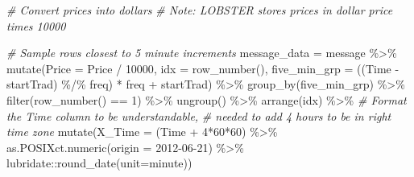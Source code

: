 \documentclass[
  oneside]{book}
\newenvironment{Shaded}{\begin{snugshade}}{\end{snugshade}}
\newcommand{\AttributeTok}[1]{\textcolor[rgb]{0.77,0.63,0.00}{#1}}
\newcommand{\CommentTok}[1]{\textcolor[rgb]{0.56,0.35,0.01}{\textit{#1}}}
\newcommand{\DecValTok}[1]{\textcolor[rgb]{0.00,0.00,0.81}{#1}}
\newcommand{\FunctionTok}[1]{\textcolor[rgb]{0.00,0.00,0.00}{#1}}
\newcommand{\NormalTok}[1]{#1}
\newcommand{\OtherTok}[1]{\textcolor[rgb]{0.56,0.35,0.01}{#1}}
\newcommand{\SpecialCharTok}[1]{\textcolor[rgb]{0.00,0.00,0.00}{#1}}
\newcommand{\StringTok}[1]{\textcolor[rgb]{0.31,0.60,0.02}{#1}}
\begin{document}
\begin{Shaded}
\begin{Highlighting}[]
\CommentTok{\# Convert prices into dollars}
\CommentTok{\#    Note: LOBSTER stores prices in dollar price times 10000}

\CommentTok{\# Sample rows closest to 5 minute increments}
\NormalTok{message\_data }\OtherTok{=}\NormalTok{ message }\SpecialCharTok{\%\textgreater{}\%}
  \FunctionTok{mutate}\NormalTok{(}\AttributeTok{Price =}\NormalTok{ Price }\SpecialCharTok{/} \DecValTok{10000}\NormalTok{,}
         \AttributeTok{idx =} \FunctionTok{row\_number}\NormalTok{(),}
         \AttributeTok{five\_min\_grp =}\NormalTok{ ((Time }\SpecialCharTok{{-}}\NormalTok{ startTrad) }\SpecialCharTok{\%/\%}\NormalTok{ freq) }\SpecialCharTok{*}\NormalTok{ freq }\SpecialCharTok{+}\NormalTok{ startTrad) }\SpecialCharTok{\%\textgreater{}\%} 
  \FunctionTok{group\_by}\NormalTok{(five\_min\_grp) }\SpecialCharTok{\%\textgreater{}\%} 
  \FunctionTok{filter}\NormalTok{(}\FunctionTok{row\_number}\NormalTok{() }\SpecialCharTok{==} \DecValTok{1}\NormalTok{) }\SpecialCharTok{\%\textgreater{}\%} 
  \FunctionTok{ungroup}\NormalTok{() }\SpecialCharTok{\%\textgreater{}\%} 
  \FunctionTok{arrange}\NormalTok{(idx) }\SpecialCharTok{\%\textgreater{}\%}
  \CommentTok{\# Format the Time column to be understandable, }
  \CommentTok{\# needed to add 4 hours to be in right time zone}
  \FunctionTok{mutate}\NormalTok{(}\AttributeTok{X\_Time =}\NormalTok{ (Time }\SpecialCharTok{+} \DecValTok{4}\SpecialCharTok{*}\DecValTok{60}\SpecialCharTok{*}\DecValTok{60}\NormalTok{) }\SpecialCharTok{\%\textgreater{}\%}
           \FunctionTok{as.POSIXct.numeric}\NormalTok{(}\AttributeTok{origin =} \StringTok{\textquotesingle{}2012{-}06{-}21\textquotesingle{}}\NormalTok{) }\SpecialCharTok{\%\textgreater{}\%} 
\NormalTok{           lubridate}\SpecialCharTok{::}\FunctionTok{round\_date}\NormalTok{(}\AttributeTok{unit=}\StringTok{\textquotesingle{}minute\textquotesingle{}}\NormalTok{))}


\end{Highlighting}
\end{Shaded}
\end{document}
